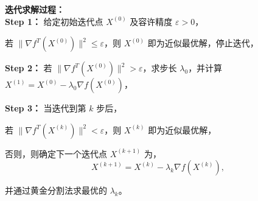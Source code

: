 \begin{notebox}{\textbf{迭代求解过程：}}{}
\\
    \noindent \textbf{Step 1：} 给定初始迭代点 $X^{(0)}$ 及容许精度 $\varepsilon > 0$，

    \bigskip
    \noindent 若 $\|\nabla f^T(X^{(0)})\|^2 \leq \varepsilon$，则 $X^{(0)}$ 即为近似最优解，停止迭代，

    \bigskip
    \noindent \textbf{Step 2：} 若 $\|\nabla f^T(X^{(0)})\|^2 > \varepsilon$，求步长 $\lambda_0$，并计算 $X^{(1)} = X^{(0)} - \lambda_0 \nabla f(X^{(0)})$，

    \bigskip
    \noindent \textbf{Step 3：} 当迭代到第 $k$ 步后，

    \bigskip
    \noindent 若 $\|\nabla f^T(X^{(k)})\|^2 < \varepsilon$，则 $X^{(k)}$ 即为近似最优解，

    \bigskip
    \noindent 否则，则确定下一个迭代点 $X^{(k+1)}$ 为，
    \[
    X^{(k+1)} = X^{(k)} - \lambda_k \nabla f(X^{(k)}),
    \]

    \noindent 并通过黄金分割法求最优的 $\lambda_k$。
\end{notebox}
    

